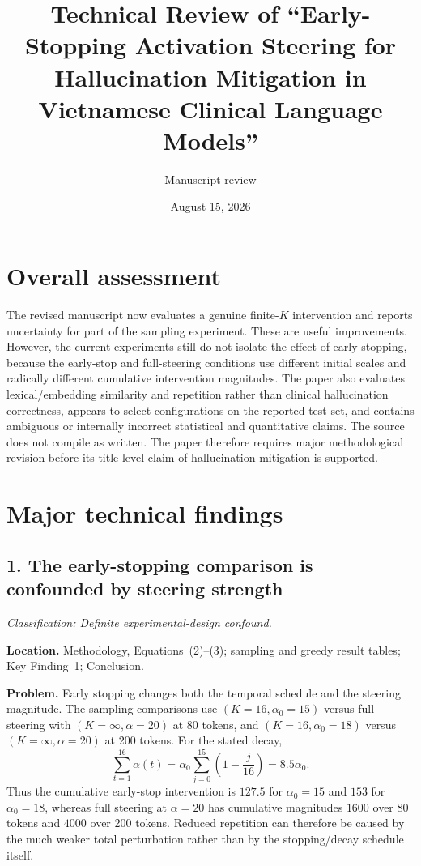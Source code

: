 \documentclass[11pt]{article}
\title{Technical Review of ``Early-Stopping Activation Steering for Hallucination Mitigation in Vietnamese Clinical Language Models''}
\author{Manuscript review}
\date{August 15, 2026}
\newcommand{\findinglabel}[1]{\textbf{#1}}
\newcommand{\classification}[1]{\textit{Classification: #1.}}
\begin{document}
\maketitle

\section*{Overall assessment}

The revised manuscript now evaluates a genuine finite-$K$ intervention and reports uncertainty for part of the sampling experiment.  These are useful improvements.  However, the current experiments still do not isolate the effect of early stopping, because the early-stop and full-steering conditions use different initial scales and radically different cumulative intervention magnitudes.  The paper also evaluates lexical/embedding similarity and repetition rather than clinical hallucination correctness, appears to select configurations on the reported test set, and contains ambiguous or internally incorrect statistical and quantitative claims.  The source does not compile as written.  The paper therefore requires major methodological revision before its title-level claim of hallucination mitigation is supported.

\section*{Major technical findings}

\subsection*{1. The early-stopping comparison is confounded by steering strength}

\classification{Definite experimental-design confound}

\findinglabel{Location.} Methodology, Equations~(2)--(3); sampling and greedy result tables; Key Finding~1; Conclusion.

\findinglabel{Problem.} Early stopping changes both the temporal schedule and the steering magnitude.  The sampling comparisons use $(K=16,\alpha_0=15)$ versus full steering with $(K=\infty,\alpha=20)$ at 80 tokens, and $(K=16,\alpha_0=18)$ versus $(K=\infty,\alpha=20)$ at 200 tokens.  For the stated decay,
\[
\sum_{t=1}^{16}\alpha(t)
=\alpha_0\sum_{j=0}^{15}\left(1-\frac{j}{16}\right)
=8.5\alpha_0.
\]
Thus the cumulative early-stop intervention is $127.5$ for $\alpha_0=15$ and $153$ for $\alpha_0=18$, whereas full steering at $\alpha=20$ has cumulative magnitudes $1600$ over 80 tokens and $4000$ over 200 tokens.  Reduced repetition can therefore be caused by the much weaker total perturbation rather than by the stopping/decay schedule itself.
\end{document}
